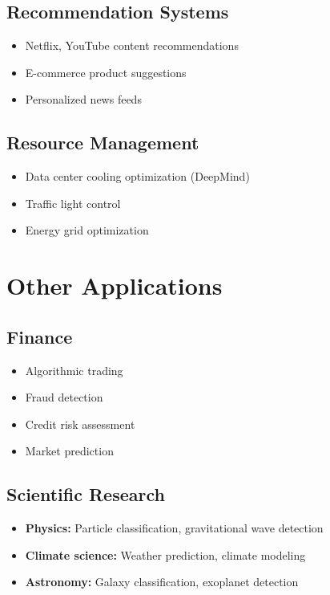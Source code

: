 \subsection{Recommendation Systems}

\begin{itemize}
    \item Netflix, YouTube content recommendations
    \item E-commerce product suggestions
    \item Personalized news feeds
\end{itemize}

\subsection{Resource Management}

\begin{itemize}
    \item Data center cooling optimization (DeepMind)
    \item Traffic light control
    \item Energy grid optimization
\end{itemize}

\section{Other Applications}
\label{sec:other-applications}

\subsection{Finance}

\begin{itemize}
    \item Algorithmic trading
    \item Fraud detection
    \item Credit risk assessment
    \item Market prediction
\end{itemize}

\subsection{Scientific Research}

\begin{itemize}
    \item \textbf{Physics:} Particle classification, gravitational wave detection
    \item \textbf{Climate science:} Weather prediction, climate modeling
    \item \textbf{Astronomy:} Galaxy classification, exoplanet detection
\end{itemize}

